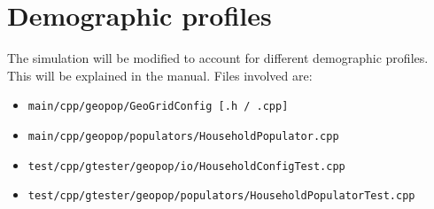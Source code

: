 \documentclass{article}
\begin{document}
\section{Demographic profiles}
The simulation will be modified to account for different demographic profiles. This will be explained in the manual. Files involved are: 
\begin{itemize}
\item \texttt{main/cpp/geopop/GeoGridConfig [.h / .cpp]}
\item \texttt{main/cpp/geopop/populators/HouseholdPopulator.cpp}
\item \texttt{test/cpp/gtester/geopop/io/HouseholdConfigTest.cpp}
\item \texttt{test/cpp/gtester/geopop/populators/HouseholdPopulatorTest.cpp}
\end{itemize}
\end{document}
